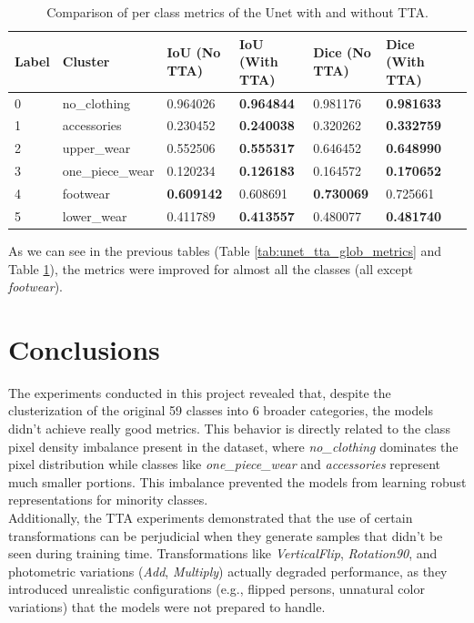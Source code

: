 \documentclass[12pt,a4paper]{article}
\begin{document}
\begin{table}[H]
\scriptsize
\begin{tabularx}{\textwidth}{llXXXXX}
\toprule
\textbf{Label} & \textbf{Cluster} & \textbf{IoU (No TTA)} & \textbf{IoU (With TTA)} & \textbf{Dice (No TTA)} & \textbf{Dice (With TTA)} \\
\midrule
0 & no\_clothing & 0.964026 & \textbf{0.964844} & 0.981176 & \textbf{0.981633} \\
\midrule
1 & accessories & 0.230452 & \textbf{0.240038} & 0.320262 & \textbf{0.332759} \\
\midrule
2 & upper\_wear & 0.552506 & \textbf{0.555317} & 0.646452 & \textbf{0.648990} \\
\midrule
3 & one\_piece\_wear & 0.120234 & \textbf{0.126183} & 0.164572 & \textbf{0.170652} \\
\midrule
4 & footwear & \textbf{0.609142} & 0.608691 & \textbf{0.730069} & 0.725661 \\
\midrule
5 & lower\_wear & 0.411789 & \textbf{0.413557} & 0.480077 & \textbf{0.481740} \\
\bottomrule
\end{tabularx}
\caption{Comparison of per class metrics of the Unet with and without TTA.}
\label{tab:unet_tta_class_metrics}
\end{table}

As we can see in the previous tables (Table \ref{tab:unet_tta_glob_metrics} and Table \ref{tab:unet_tta_class_metrics}), the metrics were improved for almost all the classes (all except \textit{footwear}).

\newpage
\section{Conclusions}

The experiments conducted in this project revealed that, despite the clusterization of the original 59 classes into 6 broader categories, the models didn't achieve really good metrics. This behavior is directly related to the class pixel density imbalance present in the dataset, where \textit{no\_clothing} dominates the pixel distribution while classes like \textit{one\_piece\_wear} and \textit{accessories} represent much smaller portions. This imbalance prevented the models from learning robust representations for minority classes.\\

Additionally, the TTA experiments demonstrated that the use of certain transformations can be perjudicial when they generate samples that didn't be seen during training time. Transformations like \textit{VerticalFlip}, \textit{Rotation90}, and photometric variations (\textit{Add}, \textit{Multiply}) actually degraded performance, as they introduced unrealistic configurations (e.g., flipped persons, unnatural color variations) that the models were not prepared to handle.
\end{document}
